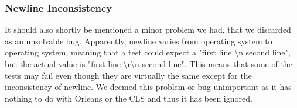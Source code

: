 \subsubsection{Newline Inconsistency}
It should also shortly be mentioned a minor problem we had, that we discarded as an unsolvable bug. Apparently, newline varies from operating system to operating system, meaning that a test could expect a "first line \textbackslash n second line", but the actual value is "first line \textbackslash r\textbackslash n second line". This means that some of the tests may fail even though they are virtually the same except for the inconsistency of newline. We deemed this problem or bug unimportant as it has nothing to do with Orleans or the CLS and thus it has been ignored.

